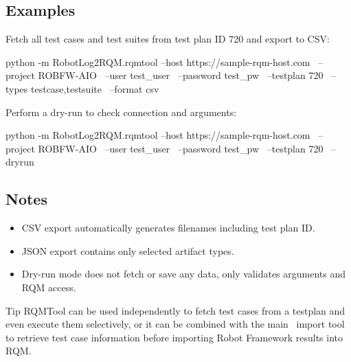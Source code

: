 \subsection{Examples}

Fetch all test cases and test suites from test plan ID 720 and export to CSV:

\begin{robotlog}
python -m RobotLog2RQM.rqmtool --host https://sample-rqm-host.com \
                               --project ROBFW-AIO \
                               --user test_user \
                               --password test_pw \
                               --testplan 720 \
                               --types testcase,testsuite \
                               --format csv
\end{robotlog}

Perform a dry-run to check connection and arguments:

\begin{robotlog}
python -m RobotLog2RQM.rqmtool --host https://sample-rqm-host.com \
                               --project ROBFW-AIO \
                               --user test_user \
                               --password test_pw \
                               --testplan 720 \
                               --dryrun
\end{robotlog}

\subsection{Notes}
\begin{itemize}
  \item CSV export automatically generates filenames including test plan ID.
  \item JSON export contains only selected artifact types.
  \item Dry-run mode does not fetch or save any data, only validates arguments and RQM access.
\end{itemize}

\begin{boxhint}{Tip}
  RQMTool can be used independently to fetch test cases from a testplan
  and even execute them selectively, or it can be combined with the main
  \pkg\ import tool to retrieve test case information before importing
  Robot Framework results into RQM.
\end{boxhint}
